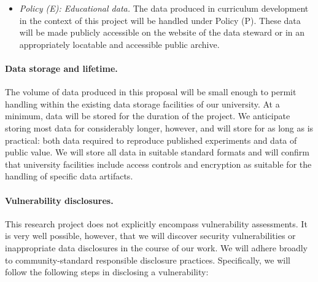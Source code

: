 \begin{itemize}
\item {\em Policy (E): Educational data.} The data produced in curriculum
development in the context of this project will be handled under Policy (P).
These data will be made publicly accessible on the website of the data steward
or in an appropriately locatable and accessible public archive.  
\end{itemize}

\paragraph{Data storage and lifetime.} The volume of data produced in this
proposal will be small enough to permit handling within the existing data
storage facilities of our university. At a minimum, data will be
stored for the duration of the project. We anticipate storing most data for
considerably longer, however, and will store for as long
as is practical: both data required to reproduce published experiments and data
of public value. We will store all data in suitable standard formats and will
confirm that university facilities include access controls and encryption as
suitable for the handling of specific data artifacts.

\paragraph{Vulnerability disclosures.} This research project does not explicitly
encompass vulnerability assessments. It is very well possible, however, that we
will discover security vulnerabilities or inappropriate data disclosures in the
course of our work.
\fi
%
We will adhere broadly to community-standard responsible disclosure practices.
Specifically, we will follow the following steps in disclosing a vulnerability:

